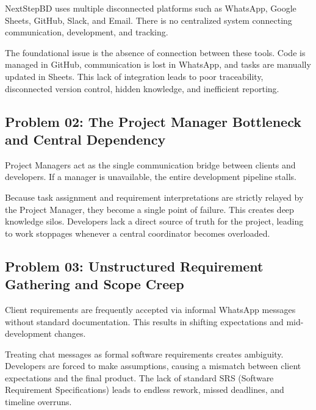 \documentclass[12pt,a4paper]{report}
\begin{document}
\begin{problemBox}
NextStepBD uses multiple disconnected platforms such as WhatsApp, Google Sheets, GitHub, Slack, and Email. There is no centralized system connecting communication, development, and tracking.
\end{problemBox}

The foundational issue is the absence of connection between these tools. Code is managed in GitHub, communication is lost in WhatsApp, and tasks are manually updated in Sheets. This lack of integration leads to poor traceability, disconnected version control, hidden knowledge, and inefficient reporting.

\subsection{Problem 02: The Project Manager Bottleneck and Central Dependency}

\begin{problemBox}
Project Managers act as the single communication bridge between clients and developers. If a manager is unavailable, the entire development pipeline stalls.
\end{problemBox}

Because task assignment and requirement interpretations are strictly relayed by the Project Manager, they become a single point of failure. This creates deep knowledge silos. Developers lack a direct source of truth for the project, leading to work stoppages whenever a central coordinator becomes overloaded.

\subsection{Problem 03: Unstructured Requirement Gathering and Scope Creep}

\begin{problemBox}
Client requirements are frequently accepted via informal WhatsApp messages without standard documentation. This results in shifting expectations and mid-development changes.
\end{problemBox}

Treating chat messages as formal software requirements creates ambiguity. Developers are forced to make assumptions, causing a mismatch between client expectations and the final product. The lack of standard SRS (Software Requirement Specifications) leads to endless rework, missed deadlines, and timeline overruns.
\end{document}
